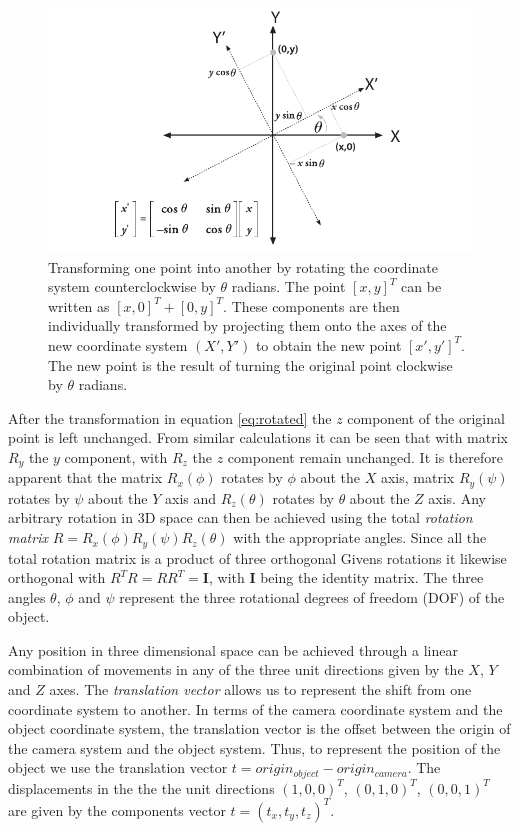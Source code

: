 \documentclass[11pt,a4paper]{report}
\begin{document}
\begin{figure}[H] 
\centering
\includegraphics[scale=0.75]{images/rotation.png}
\caption{Transforming one point into another by rotating the coordinate system
  counterclockwise by $\theta$ radians. The point $[x,y]^T$ can be written as $[x,0]^T+[0,y]^T.$ These components
are then individually transformed by projecting them onto the axes of the new
coordinate system $(X',Y')$ to obtain the new point $[x',y']^T$. The new point
is the result of turning the original point clockwise by $\theta$ radians.}
\label{fg:rotations}
\end{figure}

After the transformation in equation \ref{eq:rotated} the $z$ component of the original point is left
unchanged. From similar calculations it can be seen that with matrix $R_y$ the $y$ component, with $R_z$ the $z$ component
remain unchanged. It is therefore apparent that the matrix $R_x(\phi)$ rotates by $\phi$ about the $X$ axis, matrix $R_y(\psi)$ rotates
by $\psi$ about the $Y$ axis and $R_z(\theta)$ rotates by $\theta$ about the $Z$
axis. Any arbitrary rotation in 3D space can then be
achieved using the total \textit{rotation matrix} $R = R_x(\phi)R_y(\psi)R_z(\theta)$ with the
appropriate angles. Since all the total rotation matrix is a product of three
orthogonal Givens rotations it likewise orthogonal with $R^T R = RR^T =
\mathbf{I}$, with $\mathbf{I}$ being the identity matrix. The three angles $\theta$, $\phi$ and $\psi$ represent the three
rotational degrees of freedom (DOF) of the object.

Any position in three dimensional space can be achieved through a
linear combination of movements in any of the three unit directions given by the $X$, $Y$
and $Z$ axes. The \textit{translation vector} allows us to represent the shift
from one coordinate system to another. In terms of the camera coordinate system
and the object coordinate system, the translation vector is the offset between
the origin of the camera system and the object system. Thus, to represent the
position of the object we use the translation vector $t = origin_{object} -
origin_{camera}$. The displacements in the the the unit directions $(1,0,0)^T$,
$(0,1,0)^T$, $(0,0,1)^T$ are given by the components vector $t =
(t_x,t_y,t_z)^T$. 
\end{document}
